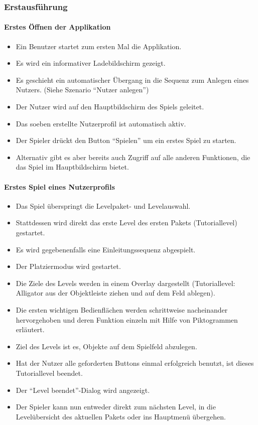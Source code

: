 \subsubsection{Erstausführung}
\paragraph{Erstes Öffnen der Applikation}
\begin{itemize}
\item Ein Benutzer startet zum ersten Mal die Applikation. 
\item Es wird ein informativer Ladebildschirm gezeigt.
\item Es geschieht ein automatischer Übergang in die Sequenz zum
Anlegen eines Nutzers. \newline (Siehe Szenario "`Nutzer anlegen"')
\item Der Nutzer wird auf den Hauptbildschirm des Spiels geleitet. 
\item Das soeben erstellte Nutzerprofil ist automatisch aktiv.
\item Der Spieler drückt den Button "`Spielen"' um ein erstes Spiel zu starten.
\item Alternativ gibt es aber bereits auch Zugriff auf alle anderen Funktionen,
die das Spiel im Hauptbildschirm bietet.
\end{itemize}

\paragraph{Erstes Spiel eines Nutzerprofils}
\begin{itemize}
\item Das Spiel überspringt die Levelpaket- und Levelauswahl.
\item Stattdessen wird direkt das erste Level des ersten Pakets (Tutoriallevel) gestartet.
\item Es wird gegebenenfalls eine Einleitungssequenz abgespielt.
\item Der Platziermodus wird gestartet.
\item Die Ziele des Levels werden in einem Overlay dargestellt (Tutoriallevel: Alligator aus der Objektleiste ziehen und auf dem Feld ablegen).
\item Die ersten wichtigen Bedienflächen werden schrittweise nacheinander hervorgehoben und deren Funktion
einzeln mit Hilfe von Piktogrammen erläutert.
\item Ziel des Levels ist es, Objekte auf dem Spielfeld abzulegen.
\item Hat der Nutzer alle geforderten Buttons einmal erfolgreich benutzt, ist dieses Tutoriallevel beendet.
\item Der "`Level beendet"'-Dialog wird angezeigt. 
\item Der Spieler kann nun entweder direkt zum nächsten Level, in die Levelübersicht des aktuellen Pakets oder
ins Hauptmenü übergehen.
\end{itemize}
